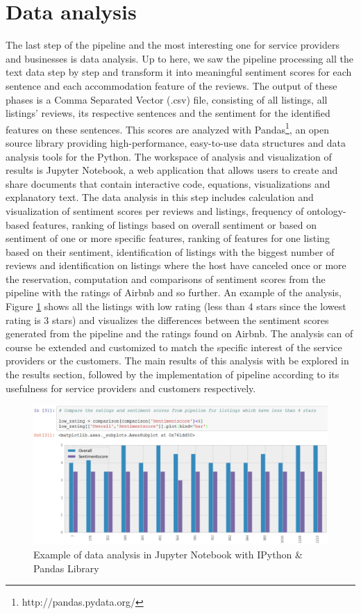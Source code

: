 \section{Data analysis}
% 
%
The last step of the pipeline and the most interesting one for service providers and businesses is data analysis. Up to here, we saw the pipeline processing all the text data step by step and transform it into meaningful sentiment scores for each sentence and each accommodation feature of the reviews. The output of these phases is a Comma Separated Vector (.csv) file, consisting of all listings, all listings' reviews, its respective sentences and the sentiment for the identified features on these sentences. This scores are analyzed with Pandas\footnote{http://pandas.pydata.org/}, an open source library providing high-performance, easy-to-use data structures and data analysis tools for the Python. The workspace  of analysis and visualization of results is Jupyter Notebook, a web application that allows users to create and share documents that contain  interactive code, equations, visualizations and explanatory text. The data  analysis in this step includes calculation and visualization of sentiment scores per reviews and listings, frequency of ontology-based features, ranking of listings based on overall sentiment or based on sentiment of one or more specific features, ranking of features for one listing based on their sentiment, identification of listings with the biggest number of reviews and identification on listings where the host have canceled once or more the reservation, computation and comparisons of sentiment scores from the pipeline with the ratings of Airbnb and so further. An example of the analysis, Figure \ref{fig:comp} shows all  the listings with low rating (less than 4 stars since the lowest rating is 3 stars) and visualizes the differences between the sentiment scores generated from the pipeline and the ratings found on Airbnb.  The analysis can of course be extended and customized to match the specific interest of the service providers or the customers. The main results of this analysis with be explored in the results section, followed by the implementation of pipeline according to its usefulness for service providers and customers respectively. 
\begin{figure}[h!]
\centering
	\includegraphics[height=0.25\textheight]{data_comparison}
	\caption{Example of data analysis in Jupyter Notebook with IPython \& Pandas Library}
	\label{fig:comp}
\end{figure}
